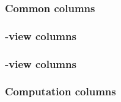 \subsubsection{Common            columns \lispTodo{}}    \label{user txn data: generalities: columns: common}          
\subsubsection{\rlpTxnMod{}-view columns \lispTodo{}}    \label{user txn data: generalities: columns: rlp view}        
\subsubsection{\hubMod{}-view    columns \lispTodo{}}    \label{user txn data: generalities: columns: hub view}        
\subsubsection{Computation       columns \lispTodo{}}    \label{user txn data: generalities: columns: computation}     

